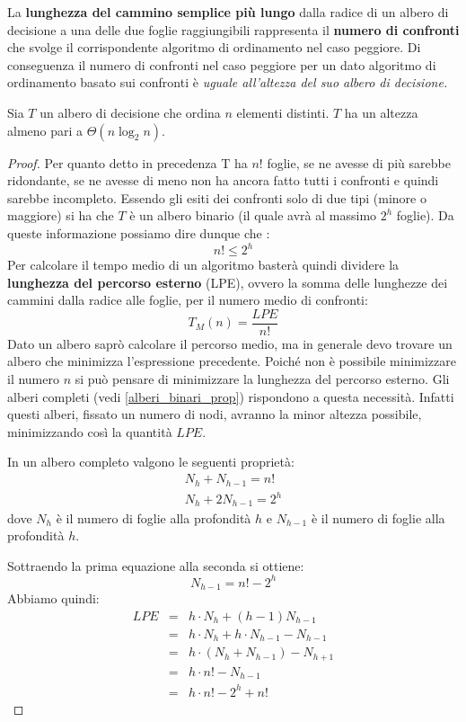 La \textbf{lunghezza del cammino semplice più lungo} dalla radice di un albero di decisione a una delle due foglie raggiungibili rappresenta il \textbf{numero di confronti} che svolge il corrispondente algoritmo di ordinamento nel caso peggiore. Di conseguenza il numero di confronti nel caso peggiore per un dato algoritmo di ordinamento basato sui confronti è \textit{uguale all'altezza del suo albero di decisione.}


\begin{teorbox}
Sia $T$ un albero di decisione che ordina $n$ elementi distinti. $T$ ha un altezza almeno pari a $\Theta(n \log_{2}n)$.
\end{teorbox}


\begin{proof}
	Per quanto detto in precedenza T ha $n!$ foglie, se ne avesse di più sarebbe ridondante, se ne avesse di meno non ha ancora fatto tutti i confronti e quindi sarebbe incompleto. Essendo gli esiti dei confronti solo di due tipi (minore o maggiore) si ha che $T$ è un albero binario (il quale avrà al massimo $2^{h}$ foglie). Da queste informazione possiamo dire dunque che :
	\begin{displaymath}
		n! \leq 2^{h}
	\end{displaymath}
	Per calcolare il tempo medio di un algoritmo basterà quindi dividere la \textbf{lunghezza del percorso esterno} (LPE), ovvero la somma delle lunghezze dei cammini dalla radice alle foglie, per il numero medio di confronti:
	\begin{displaymath}
		T_{M}(n)=\frac{LPE}{n!}
	\end{displaymath}
	Dato un albero saprò calcolare il percorso medio, ma in generale devo trovare un albero che minimizza l'espressione precedente. Poiché non è possibile minimizzare il numero $n$ si può pensare di minimizzare la lunghezza del percorso esterno. Gli alberi completi (vedi \ref{alberi_binari_prop}) rispondono a questa necessità. Infatti questi alberi, fissato un numero di nodi, avranno la minor altezza possibile, minimizzando così la quantità $LPE$.


	In un albero completo valgono le seguenti proprietà:
	\begin{eqnarray}
		N_{h} + N_{h-1} = n!\\
		N_{h} + 2N_{h-1} = 2^{h}
	\end{eqnarray}
	dove $N_{h}$ è il numero di foglie alla profondità $h$ e $N_{h-1}$ è il numero di foglie alla profondità $h$.

	Sottraendo la prima equazione alla seconda si ottiene:
	\begin{equation}
		N_{h-1}= n! - 2^{h}
	\end{equation}
	Abbiamo quindi:
	\begin{eqnarray}
		LPE &=& h \cdot N_{h} + (h-1)N_{h-1} \nonumber \\
		&=& h \cdot N_{h}+ h\cdot N_{h-1} - N_{h-1} \nonumber \\
		&=& h \cdot ( N_{h} + N_{h-1}) - N_{h+1} \nonumber \\
		&=& h \cdot n! - N_{h-1} \nonumber \\
		&=& h \cdot n! - 2^{h} + n!
	\end{eqnarray}


\end{proof}
